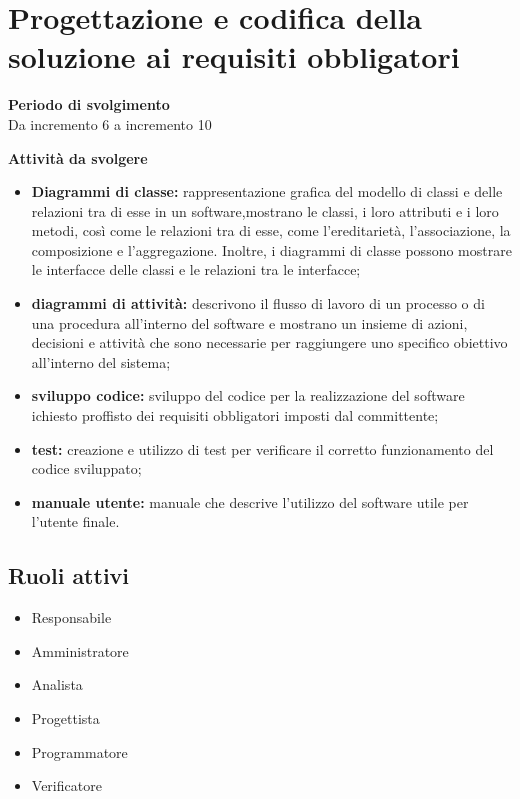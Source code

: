 \section{Progettazione e codifica della soluzione ai requisiti obbligatori}

\textbf{Periodo di svolgimento}
\\ Da incremento 6 a incremento 10

\textbf{Attività da svolgere}
    \begin{itemize}
        \item \textbf{Diagrammi di classe:} rappresentazione grafica del modello di classi e delle relazioni tra di esse in un software,mostrano le classi, i loro attributi e i loro metodi, così come le relazioni tra di esse, come l'ereditarietà, l'associazione, la composizione e l'aggregazione. Inoltre, i diagrammi di classe possono mostrare le interfacce delle classi e le relazioni tra le interfacce; 
        \item \textbf{diagrammi di attività:} descrivono il flusso di lavoro di un processo o di una procedura all'interno del software e mostrano un insieme di azioni, decisioni e attività che sono necessarie per raggiungere uno specifico obiettivo all'interno del sistema;
        \item \textbf{sviluppo codice:} sviluppo del codice per la realizzazione del software ichiesto proffisto dei requisiti obbligatori imposti dal committente;
        \item \textbf{test:} creazione e utilizzo di test per verificare il corretto funzionamento del codice sviluppato;
        \item \textbf{manuale utente:} manuale che descrive l'utilizzo del software utile per l'utente finale.
    \end{itemize}

\subsection{Ruoli attivi}
\begin{itemize}
    \item Responsabile 
    \item Amministratore
    \item Analista
    \item Progettista 
    \item Programmatore 
    \item Verificatore 
\end{itemize}


